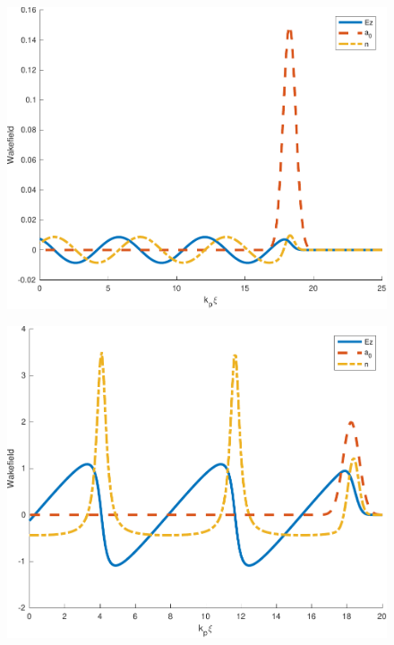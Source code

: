 \begin{figure}[h]
  \centering
  \includegraphics[scale = 0.6]{figures/linearwakefield.pdf}
  \caption{}
  \label{fig:linearwakefield}
\end{figure}
\begin{figure}[]
  \centering
  \includegraphics[scale = 0.6]{figures/wakefield.pdf}
  \caption{}
  \label{fig:wakefield}
\end{figure}

